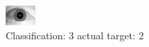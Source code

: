 \begin{figure}[h!]
\begin{center}
\includegraphics[width=0.60\columnwidth]{figures/ID1745_class_3_target_2.png}
\end{center}
\caption{ Classification: 3 actual target: 2}
\label{fig:ID1745_class_3_target_2}
\end{figure}
